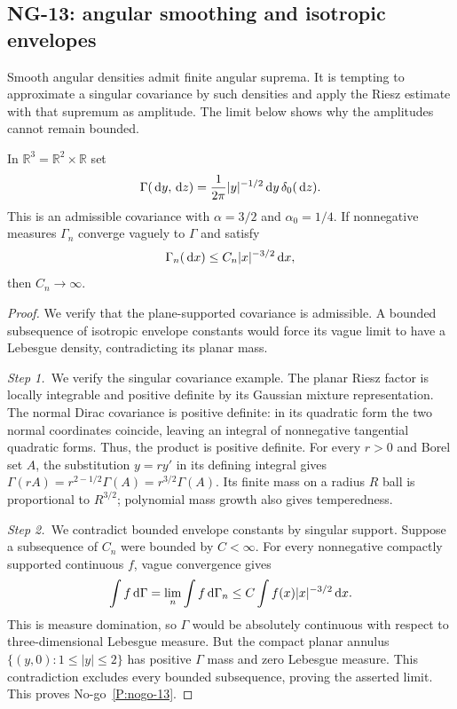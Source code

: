 \subsection{NG-13: angular smoothing and isotropic envelopes}\label{S:nogo-13}

Smooth angular densities admit finite angular suprema. It is tempting to
approximate a singular covariance by such densities and apply the Riesz
estimate with that supremum as amplitude. The limit below shows why the
amplitudes cannot remain bounded.

\setcounter{nogo}{12}
\begin{nogo}
  \label{P:nogo-13}
  In $\mathbb R^3=\mathbb R^2\times\mathbb R$ set
  \[
    \Gamma(\,\mathrm{d} y,\,\mathrm{d} z)=\frac1{2\pi}|y|^{-1/2}\,\mathrm{d} y\,\delta_0(\,\mathrm{d} z).
  \]
  This is an admissible covariance with $\alpha=3/2$ and
  $\alpha_0=1/4$. If nonnegative measures $\Gamma_n$ converge vaguely to
  $\Gamma$ and satisfy
  \[
    \Gamma_n(\,\mathrm{d} x)\le C_n|x|^{-3/2}\,\mathrm{d} x,
  \]
  then $C_n\to\infty$.
\end{nogo}
\begin{proof}
  We verify that the plane-supported covariance is admissible. A bounded
  subsequence of isotropic envelope constants would force its vague limit to
  have a Lebesgue density, contradicting its planar mass.


  \medskip
  \noindent\textit{Step 1.~}We verify the singular covariance example.
  The planar Riesz factor is locally integrable and positive definite by
  its Gaussian mixture representation. The normal Dirac covariance is
  positive definite: in its quadratic form the two normal coordinates
  coincide, leaving an integral of nonnegative tangential quadratic
  forms. Thus, the product is positive definite. For every $r>0$ and
  Borel set $A$, the substitution $y=ry'$ in its defining integral gives
  $\Gamma(rA)=r^{2-1/2}\Gamma(A)=r^{3/2}\Gamma(A)$. Its finite mass on
  a radius $R$ ball is proportional to $R^{3/2}$; polynomial mass growth
  also gives temperedness.


  \medskip
  \noindent\textit{Step 2.~}We contradict bounded envelope constants by
  singular support.
  Suppose a subsequence of $C_n$ were bounded by $C<\infty$. For every
  nonnegative compactly supported continuous $f$, vague convergence gives
  \[
    \int f\,\mathrm{d}\Gamma=\lim_n\int f\,\mathrm{d}\Gamma_n
    \le C\int f(x)|x|^{-3/2}\,\mathrm{d} x.
  \]
  This is measure domination, so $\Gamma$ would be absolutely continuous
  with respect to three-dimensional Lebesgue measure. But the compact
  planar annulus $\{(y,0):1\le|y|\le2\}$ has positive $\Gamma$ mass and
  zero Lebesgue measure. This contradiction excludes every bounded
  subsequence, proving the asserted limit.
  This proves No-go~\ref{P:nogo-13}.
\end{proof}

